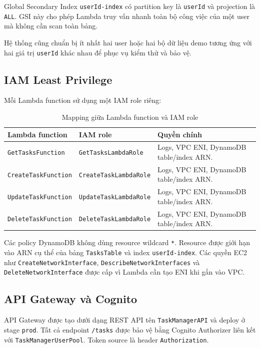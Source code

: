 Global Secondary Index \texttt{userId-index} có partition key là \texttt{userId} và projection là \texttt{ALL}. GSI này cho phép Lambda truy vấn nhanh toàn bộ công việc của một user mà không cần scan toàn bảng.

Hệ thống cũng chuẩn bị ít nhất hai user hoặc hai bộ dữ liệu demo tương ứng với hai giá trị \texttt{userId} khác nhau để phục vụ kiểm thử và bảo vệ.

\subsection{IAM Least Privilege}

Mỗi Lambda function sử dụng một IAM role riêng:

\begin{table}[H]
\centering
\begin{tabular}{|p{5cm}|p{5cm}|p{4cm}|}
\hline
\textbf{Lambda function} & \textbf{IAM role} & \textbf{Quyền chính} \\
\hline
\texttt{GetTasksFunction} & \texttt{GetTasksLambdaRole} & Logs, VPC ENI, DynamoDB table/index ARN. \\
\hline
\texttt{CreateTaskFunction} & \texttt{CreateTaskLambdaRole} & Logs, VPC ENI, DynamoDB table/index ARN. \\
\hline
\texttt{UpdateTaskFunction} & \texttt{UpdateTaskLambdaRole} & Logs, VPC ENI, DynamoDB table/index ARN. \\
\hline
\texttt{DeleteTaskFunction} & \texttt{DeleteTaskLambdaRole} & Logs, VPC ENI, DynamoDB table/index ARN. \\
\hline
\end{tabular}
\caption{Mapping giữa Lambda function và IAM role}
\end{table}

Các policy DynamoDB không dùng resource wildcard \texttt{*}. Resource được giới hạn vào ARN cụ thể của bảng \texttt{TasksTable} và index \texttt{userId-index}. Các quyền EC2 như \texttt{CreateNetworkInterface}, \texttt{DescribeNetworkInterfaces} và \texttt{DeleteNetworkInterface} được cấp vì Lambda cần tạo ENI khi gắn vào VPC.

\subsection{API Gateway và Cognito}

API Gateway được tạo dưới dạng REST API tên \texttt{TaskManagerAPI} và deploy ở stage \texttt{prod}. Tất cả endpoint \texttt{/tasks} được bảo vệ bằng Cognito Authorizer liên kết với \texttt{TaskManagerUserPool}. Token source là header \texttt{Authorization}.

